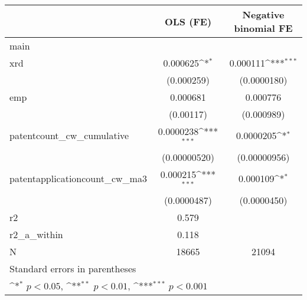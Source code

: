 {
\def\sym#1{\ifmmode^{#1}\else\(^{#1}\)\fi}
\begin{tabular}{l*{2}{c}}
\hline\hline
            &\multicolumn{1}{c}{OLS (FE)}&\multicolumn{1}{c}{Negative binomial FE}\\
\hline
main        &                     &                     \\
xrd         &    0.000625\sym{*}  &    0.000111\sym{***}\\
            &  (0.000259)         & (0.0000180)         \\
[1em]
emp         &    0.000681         &    0.000776         \\
            &   (0.00117)         &  (0.000989)         \\
[1em]
patentcount\_cw\_cumulative&   0.0000238\sym{***}&   0.0000205\sym{*}  \\
            &(0.00000520)         &(0.00000956)         \\
[1em]
patentapplicationcount\_cw\_ma3&    0.000215\sym{***}&    0.000109\sym{*}  \\
            & (0.0000487)         & (0.0000450)         \\
\hline
r2          &       0.579         &                     \\
r2\_a\_within &       0.118         &                     \\
N           &       18665         &       21094         \\
\hline\hline
\multicolumn{3}{l}{\footnotesize Standard errors in parentheses}\\
\multicolumn{3}{l}{\footnotesize \sym{*} \(p<0.05\), \sym{**} \(p<0.01\), \sym{***} \(p<0.001\)}\\
\end{tabular}
}
